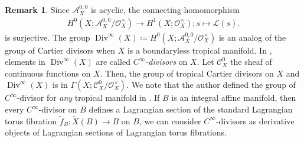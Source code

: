 \documentclass[a4paper,dvipdfmx,reqno,12pt]{amsart}
\theoremstyle{definition}
\newtheorem{remark}[theorem]{Remark}
\newcommand{\deq}{\coloneqq}
\newcommand{\opn}[1]{\operatorname{#1}}
\numberwithin{equation}{section}
\begin{document}
\begin{remark}
Since $\mathcal{A}^{0,0}_X$ is acyclic,
the connecting homomorphism
\begin{align}
H^{0}(X;\mathcal{A}^{0,0}_X/\mathcal{O}_X^{\times})
\to H^{1}(X;\mathcal{O}_X^{\times}); s\mapsto \mathcal{L}(s).
\end{align}
is surjective. The group 
$\opn{Div}^{\infty}(X)\deq 
H^{0}(X;\mathcal{A}^{0,0}_X/\mathcal{O}_X^{\times})$
is an analog of the group of Cartier divisors
when $X$ is a boundaryless tropical manifold.
In \cite{tsutsui2023graded}, elements 
in $\opn{Div}^{\infty}(X)$ are called 
\emph{$C^{\infty}$-divisors} on $X$.
Let $\mathcal{C}^{0}_X$ the sheaf of continuous functions
on $X$. Then, the group of tropical Cartier divisors on
$X$ and $\opn{Div}^{\infty}(X)$ is in 
$\Gamma (X;\mathcal{C}^{0}_X/\mathcal{O}_X^{\times})$.
We note that the author 
defined the group of $C^{\infty}$-divisor for \emph{any}
tropical manifold in \cite{tsutsui2023graded}.
If $B$ is an integral affine manifold,
then every $C^{\infty}$-divisor on $B$ defines
a Lagrangian section of the standard Lagrangian
torus fibration $\check{f}_B\colon \check{X}(B)\to B$
on $B$, we can consider $C^{\infty}$-divisors
as derivative objects of Lagrangian sections of
Lagrangian torus fibrations.


\end{remark}
\end{document}

